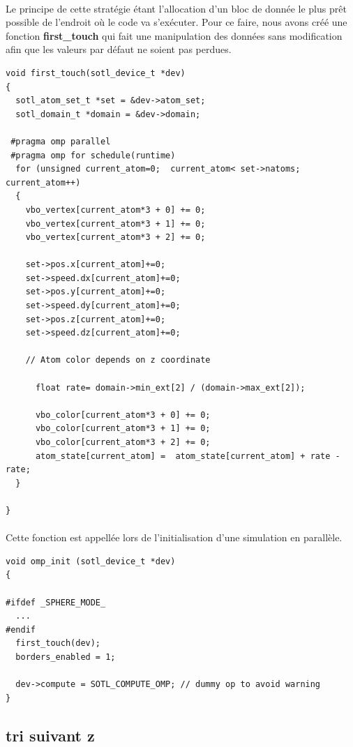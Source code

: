 \documentclass[a4paper,11pt]{report}
\begin{document}
\paragraph{}
Le principe de  cette stratégie étant l'allocation d'un bloc de donnée le plus prêt possible de l'endroit où le code va s'exécuter. Pour ce faire, nous avons créé une fonction \textbf{first\_touch} qui fait une manipulation des données sans modification afin que les valeurs par défaut ne soient pas perdues. 
\newline
\begin{lstlisting}[style=CStyle]
void first_touch(sotl_device_t *dev)
{
  sotl_atom_set_t *set = &dev->atom_set;
  sotl_domain_t *domain = &dev->domain;

 #pragma omp parallel
 #pragma omp for schedule(runtime)
  for (unsigned current_atom=0;  current_atom< set->natoms; current_atom++)
  {
    vbo_vertex[current_atom*3 + 0] += 0;
    vbo_vertex[current_atom*3 + 1] += 0;
    vbo_vertex[current_atom*3 + 2] += 0;

    set->pos.x[current_atom]+=0;
    set->speed.dx[current_atom]+=0;
    set->pos.y[current_atom]+=0;
    set->speed.dy[current_atom]+=0;
    set->pos.z[current_atom]+=0;
    set->speed.dz[current_atom]+=0;

    // Atom color depends on z coordinate
    
      float rate= domain->min_ext[2] / (domain->max_ext[2]);
      
      vbo_color[current_atom*3 + 0] += 0;
      vbo_color[current_atom*3 + 1] += 0;
      vbo_color[current_atom*3 + 2] += 0;
      atom_state[current_atom] =  atom_state[current_atom] + rate - rate;
  }

}
\end{lstlisting}
\paragraph{}
Cette fonction est appellée lors de l'initialisation d'une simulation en parallèle. 
\newline
\begin{lstlisting}[style=CStyle]
void omp_init (sotl_device_t *dev)
{

#ifdef _SPHERE_MODE_
  ...
#endif
  first_touch(dev);
  borders_enabled = 1;

  dev->compute = SOTL_COMPUTE_OMP; // dummy op to avoid warning
}
\end{lstlisting}
\subsection{tri suivant z }
\end{document}
